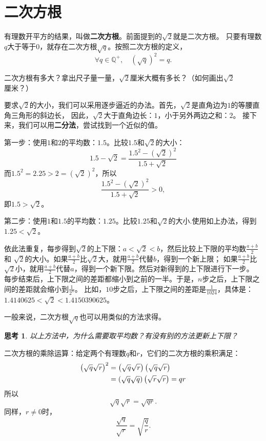 \documentclass[12pt,UTF8]{ctexbook}
\newtheorem{sk}{思考}[section]
\begin{document}
\section{二次方根}
有理数开平方的结果，叫做\textbf{二次方根}。前面提到的$\sqrt{2}$就是二次方根。
只要有理数$q$大于等于$0$，就存在二次方根$\sqrt{q}$。按照二次方根的定义，
$$\forall q\in\mathbb{Q}^+, \quad \left(\sqrt{q}\right)^2 = q.$$

二次方根有多大？拿出尺子量一量，$\sqrt{2}$厘米大概有多长？（如何画出$\sqrt{2}$厘米？）

要求$\sqrt{2}$的大小，我们可以采用逐步逼近的办法。首先，$\sqrt{2}$是直角边为$1$的等腰直角三角形的斜边长，
因此，$\sqrt{2}$大于直角边长：$1$，小于另外两边之和：$2$。
接下来，我们可以用\textbf{二分法}，尝试找到一个近似的值。

第一步：使用$1$和$2$的平均数：$1.5$。比较$1.5$和$\sqrt{2}$的大小：
$$ 1.5 - \sqrt{2} = \frac{1.5^2 - \left(\sqrt{2}\right)^2}{1.5 + \sqrt{2}} $$
而$1.5^2 = 2.25 > 2 = \left(\sqrt{2}\right)^2$，所以
$$ \frac{1.5^2 - \left(\sqrt{2}\right)^2}{1.5 + \sqrt{2}} > 0,$$
即$1.5 > \sqrt{2}$。

第二步：使用$1$和$1.5$的平均数：$1.25$。比较$1.25$和$\sqrt{2}$的大小.使用如上办法，得到
$1.25 < \sqrt{2}$。

依此法重复，每步得到$\sqrt{2}$的上下限：$a < \sqrt{2} < b$，然后比较上下限的平均数$\frac{a+b}{2}$和
$\sqrt{2}$的大小。如果$\frac{a+b}{2}$比$\sqrt{2}$大，就用$\frac{a+b}{2}$代替$b$，得到一个新上限；
如果$\frac{a+b}{2}$比$\sqrt{2}$小，就用$\frac{a+b}{2}$代替$a$，得到一个新下限。然后对新得到的上下限进行下一步。
每步结束后，上下限之间的差距都缩小到之前的一半。于是，$n$步之后，上下限之间的差距就会缩小到$\frac{1}{2^n}$。
比如，$10$步之后，上下限之间的差距是$\frac{1}{1024}$，具体是：$1.4140625 < \sqrt{2} < 1.4150390625$。

一般来说，二次方根$\sqrt{q}$也可以用类似的方法求得。
\begin{sk}\label{sk:3-2-0}
    以上方法中，为什么需要取平均数？有没有别的方法更新上下限？
\end{sk}

二次方根的乘除运算：给定两个有理数$q$和$r$，它们的二次方根的乘积满足：
\begin{align}
    \left(\sqrt{q}\sqrt{r}\right)^2 &=  \left(\sqrt{q}\sqrt{r}\right)\left(\sqrt{q}\sqrt{r}\right) \notag \\
    &= \left(\sqrt{q}\sqrt{q}\right)\left(\sqrt{r}\sqrt{r}\right) = qr \notag 
\end{align}
所以
$$\sqrt{q}\sqrt{r} = \sqrt{qr}.$$
同样，$r \neq 0$时，
$$\frac{\sqrt{q}}{\sqrt{r}} = \sqrt{\frac{q}{r}}.$$
\end{document}
